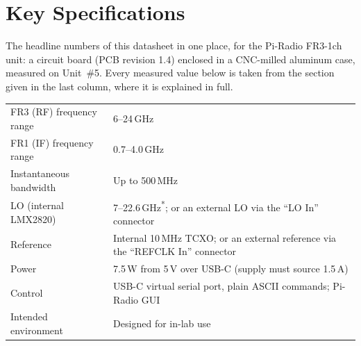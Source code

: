 \clearpage
\section{Key Specifications}
\label{sec:summary}
%
%

\raggedbottom%
\newlength{\summarywidth}\setlength{\summarywidth}{0.84\linewidth}%

The headline numbers of this datasheet in one place, for the Pi-Radio FR3-1ch unit: a circuit board (PCB revision
1.4) enclosed in a CNC-milled aluminum case, measured on Unit~\#5. Every
measured value below is taken from the section given in the last column, where it is explained in full.

\par\medskip\noindent\begin{minipage}{\linewidth}%
\begin{center}
\label{tab:summary-general}
\vspace{0.4em}
\footnotesize
\begin{tabularx}{\summarywidth}{|l|X|}
\hline
FR3 (RF) frequency range & 6--24\,GHz \\
FR1 (IF) frequency range & 0.7--4.0\,GHz \\
Instantaneous bandwidth & Up to 500\,MHz \\
LO (internal LMX2820) & 7--22.6\,GHz\textsuperscript{*}; or an external LO via the ``LO In'' connector \\
Reference & Internal 10\,MHz TCXO; or an external reference via the ``REFCLK In'' connector \\
Power & 7.5\,W from 5\,V over USB-C (supply must source 1.5\,A) \\
Control & USB-C virtual serial port, plain ASCII commands; Pi-Radio GUI \\
Intended environment & Designed for in-lab use \\
\hline
\end{tabularx}
\par{}
\end{center}
\end{minipage}\par


